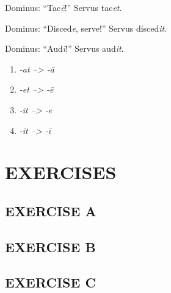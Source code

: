Dominus: ``Tac\emph{\=e}!'' Servus tac\emph{et}.

Dominus: ``Disced\emph{e}, serve!'' Servus disced\emph{it}.

Dominus: ``Aud\emph{\=i}!'' Servus aud\emph{it}.

\begin{enumerate}[(1)]
  \item \emph{-at --> -\=a}
  \item \emph{-et --> -\=e}
  \item \emph{-it --> -e}
  \item \emph{-it --> -\=i}
\end{enumerate}

\section[Exercises]{EXERCISES}
\subsection*{EXERCISE A}

\subsection*{EXERCISE B}

\subsection*{EXERCISE C}
